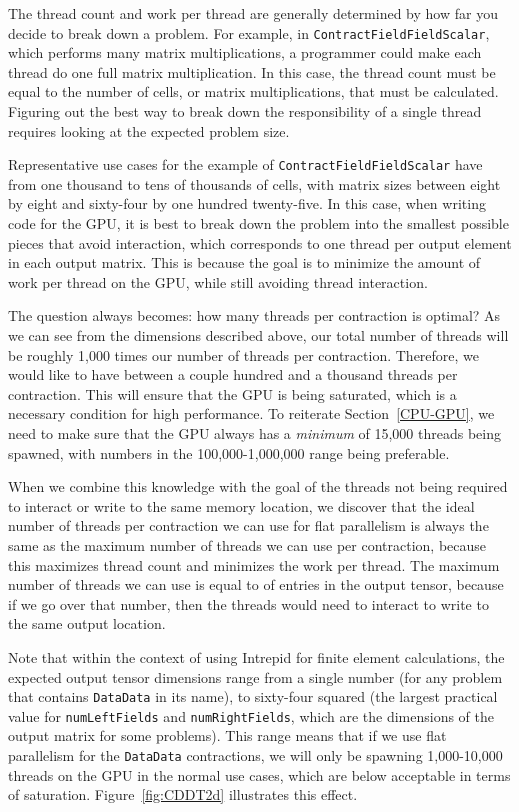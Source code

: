 The thread count and work per thread are generally determined by how far you
decide to break down a problem. For example, in
\texttt{ContractFieldFieldScalar}, which performs many matrix multiplications, a
programmer could make each thread do one full matrix multiplication. In this
case, the thread count must be equal to the number of cells, or matrix
multiplications, that must be calculated. Figuring out the best way to break
down the responsibility of a single thread requires looking at the expected
problem size. 

Representative use cases for the example of \texttt{ContractFieldFieldScalar}
have from one thousand to tens of thousands of cells, with matrix sizes between
eight by eight and sixty-four by one hundred twenty-five. In this case, when
writing code for the GPU, it is best to break down the problem into the smallest
possible pieces that avoid interaction, which corresponds to one thread per
output element in each output matrix. This is because the goal is to minimize
the amount of work per thread on the GPU, while still avoiding thread
interaction. 

The question always becomes: how many threads per contraction is optimal?  As we
can see from the dimensions described above, our total number of threads will be
roughly 1,000 times our number of threads per contraction. Therefore, we would
like to have between a couple hundred and a thousand threads per contraction.
This will ensure that the GPU is being saturated, which is a necessary condition
for high performance.  To reiterate Section~\ref{CPU-GPU}, we need to make sure
that the GPU always has a \emph{minimum} of 15,000 threads being spawned, with
numbers in the 100,000-1,000,000 range being preferable.

When we combine this knowledge with the goal of the threads not being required
to interact or write to the same memory location, we discover that the ideal
number of threads per contraction we can use for flat parallelism is always the
same as the maximum number of threads we can use per contraction, because this
maximizes thread count and minimizes the work per thread.  The maximum number of
threads we can use is equal to of entries in the output tensor, because if we go
over that number, then the threads would need to interact to write to the same
output location.

Note that within the context of using Intrepid for finite element calculations,
the expected output tensor dimensions range from a single number (for any
problem that contains \texttt{DataData} in its name), to sixty-four squared (the
largest practical value for \texttt{numLeftFields} and \texttt{numRightFields},
which are the dimensions of the output matrix for some problems). This range
means that if we use flat parallelism for the \texttt{DataData} contractions, we
will only be spawning 1,000-10,000 threads on the GPU in the normal use cases,
which are below acceptable in terms of saturation.  Figure~\ref{fig:CDDT2d}
illustrates this effect.

